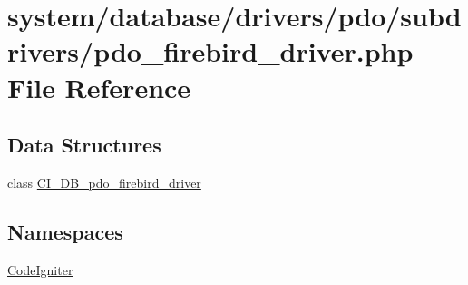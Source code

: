 \hypertarget{pdo__firebird__driver_8php}{}\section{system/database/drivers/pdo/subdrivers/pdo\+\_\+firebird\+\_\+driver.php File Reference}
\label{pdo__firebird__driver_8php}
\subsection*{Data Structures}
\begin{DoxyCompactItemize}
\item 
class \mbox{\hyperlink{class_c_i___d_b__pdo__firebird__driver}{C\+I\+\_\+\+D\+B\+\_\+pdo\+\_\+firebird\+\_\+driver}}
\end{DoxyCompactItemize}
\subsection*{Namespaces}
\begin{DoxyCompactItemize}
\item 
 \mbox{\hyperlink{namespace_code_igniter}{Code\+Igniter}}
\end{DoxyCompactItemize}
